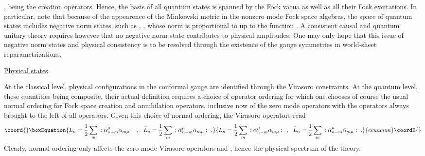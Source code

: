 \documentclass[a4paper,11pt]{article}
\begin{document}
\coordHE{}, being the creation ope\-ra\-tors. Hence, the basis of all quantum
states is spanned by the Fock vacua \coordHE{} as well as all their
Fock excitations. In particular, note that because of the appearence of
the Minkowski metric in the nonzero mode Fock space algebras, the space
of quantum states includes negative norm states, such as
\coordHE{}, \coordHE{}, whose norm is proportional to
\myHighlight{$\eta^{\mu\nu}$}\coordHE{} up to the function \coordHE{}. A consistent
causal and quantum unitary theory requires however that no negative norm
state contributes to physical amplitudes. One may only hope that this issue
of negative norm states and physical consistency is to be resolved through
the existence of the gauge symmetries in world-sheet reparametrizations.

\vspace{10pt}

\noindent\underline{Physical states}

\vspace{10pt}

At the classical level, physical configurations in the conformal gauge
are identified through the Virasoro constraints. At the quantum level,
these quantities being composite, their actual definition requires a choice
of operator ordering for which one chooses of course the usual normal
ordering for Fock space creation and annihilation ope\-ra\-tors, inclusive
now of the zero mode ope\-ra\-tors with the \coordHE{} operators always brought
to the left of all \coordHE{} operators. Given this choice of normal ordering,
the Virasoro operators read
\begin{equation}\coord{}\boxEquation{
L_n=\frac{1}{2}\sum_m\,:\alpha^\mu_{n-m}\alpha_{m\mu}:\ \ ,\ \ 
\bar{L}_n=\frac{1}{2}\sum_m\,:\bar{\alpha}^\mu_{n-m}\bar{\alpha}_{m\mu}:\ .
}{
L_n=\frac{1}{2}\sum_m\,:\alpha^\mu_{n-m}\alpha_{m\mu}:\ \ ,\ \ 
\bar{L}_n=\frac{1}{2}\sum_m\,:\bar{\alpha}^\mu_{n-m}\bar{\alpha}_{m\mu}:\ .
}{ecuacion}\coordE{}\end{equation}
Clearly, normal ordering only affects the zero mode Virasoro operators
\myHighlight{$L_0$}\coordHE{} and \coordHE{}, hence the physical spectrum of the theory.
\end{document}
